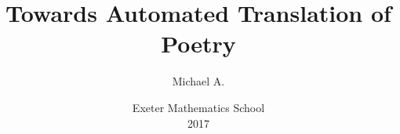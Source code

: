 \documentclass[a4,oneside,12pt]{extarticle}
\begin{document}
\thispagestyle{empty}
\title{
  {\textbf{Towards Automated Translation of Poetry}}}
\author{Michael A.}
\date{Exeter Mathematics School \\ 2017}
\maketitle

\thispagestyle{empty}
\titlepage
\end{document}
